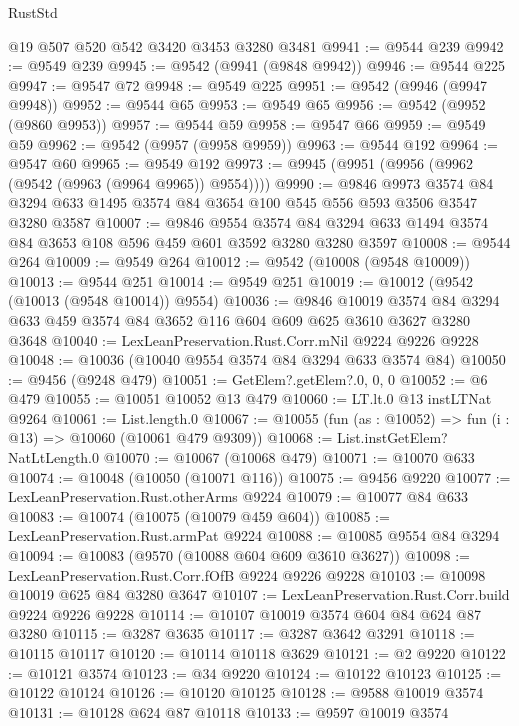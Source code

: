 \begin{lexlean}{RustStd}
\begin{coremodule}
{\begin{coremodule}
{{{{{{{{{{{{{{{{{{{{{{{{{{{{{{{{{    @19
    @507
    @520
    @542
    @3420
    @3453
    @3280
    @3481
@9941 := @9544 @239
@9942 := @9549 @239
@9945 := @9542 (@9941 (@9848 @9942))
@9946 := @9544 @225
@9947 := @9547 @72
@9948 := @9549 @225
@9951 := @9542 (@9946 (@9947 @9948))
@9952 := @9544 @65
@9953 := @9549 @65
@9956 := @9542 (@9952 (@9860 @9953))
@9957 := @9544 @59
@9958 := @9547 @66
@9959 := @9549 @59
@9962 := @9542 (@9957 (@9958 @9959))
@9963 := @9544 @192
@9964 := @9547 @60
@9965 := @9549 @192
@9973 := @9945 (@9951 (@9956 (@9962 (@9542 (@9963 (@9964 @9965)) @9554))))
@9990 := @9846
    @9973
    @3574
    @84
    @3294
    @633
    @1495
    @3574
    @84
    @3654
    @100
    @545
    @556
    @593
    @3506
    @3547
    @3280
    @3587
@10007 := @9846
    @9554
    @3574
    @84
    @3294
    @633
    @1494
    @3574
    @84
    @3653
    @108
    @596
    @459
    @601
    @3592
    @3280
    @3280
    @3597
@10008 := @9544 @264
@10009 := @9549 @264
@10012 := @9542 (@10008 (@9548 @10009))
@10013 := @9544 @251
@10014 := @9549 @251
@10019 := @10012 (@9542 (@10013 (@9548 @10014)) @9554)
@10036 := @9846
    @10019
    @3574
    @84
    @3294
    @633
    @459
    @3574
    @84
    @3652
    @116
    @604
    @609
    @625
    @3610
    @3627
    @3280
    @3648
@10040 := LexLeanPreservation.Rust.Corr.mNil @9224 @9226 @9228
@10048 := @10036 (@10040 @9554 @3574 @84 @3294 @633 @3574 @84)
@10050 := @9456 (@9248 @479)
@10051 := GetElem?.getElem?.{0, 0, 0}
@10052 := @6 @479
@10055 := @10051 @10052 @13 @479
@10060 := LT.lt.{0} @13 instLTNat @9264
@10061 := List.length.{0}
@10067 := @10055 (fun (as : @10052) => fun (i : @13) => @10060 (@10061 @479 @9309))
@10068 := List.instGetElem?NatLtLength.{0}
@10070 := @10067 (@10068 @479)
@10071 := @10070 @633
@10074 := @10048 (@10050 (@10071 @116))
@10075 := @9456 @9220
@10077 := LexLeanPreservation.Rust.otherArms @9224
@10079 := @10077 @84 @633
@10083 := @10074 (@10075 (@10079 @459 @604))
@10085 := LexLeanPreservation.Rust.armPat @9224
@10088 := @10085 @9554 @84 @3294
@10094 := @10083 (@9570 (@10088 @604 @609 @3610 @3627))
@10098 := LexLeanPreservation.Rust.Corr.fOfB @9224 @9226 @9228
@10103 := @10098 @10019 @625 @84 @3280 @3647
@10107 := LexLeanPreservation.Rust.Corr.build @9224 @9226 @9228
@10114 := @10107 @10019 @3574 @604 @84 @624 @87 @3280
@10115 := @3287 @3635
@10117 := @3287 @3642 @3291
@10118 := @10115 @10117
@10120 := @10114 @10118 @3629
@10121 := @2 @9220
@10122 := @10121 @3574
@10123 := @34 @9220
@10124 := @10122 @10123
@10125 := @10122 @10124
@10126 := @10120 @10125
@10128 := @9588 @10019 @3574
@10131 := @10128 @624 @87 @10118
@10133 := @9597 @10019 @3574
}}}}}}}}}}}}}}}}}}}}}}}}}}}}}}}}}
\end{coremodule}}
\end{coremodule}
\end{lexlean}
